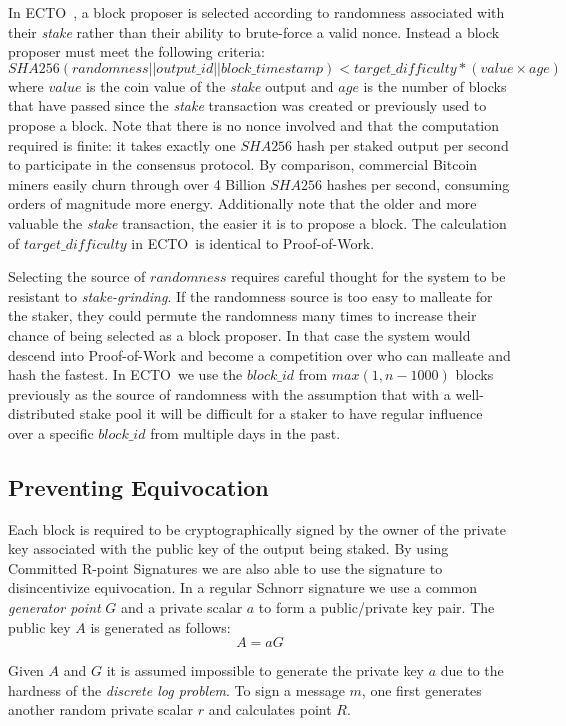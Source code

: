 \documentclass{article}
\newcommand{\coin}{ \textsc{ECTO}\ }
\begin{document}
In \coin, a block proposer is selected according to randomness associated with their \textit{stake} rather than their ability to brute-force a valid nonce. Instead a block proposer must meet the following criteria:  
$$SHA256(randomness || output\_id || block\_timestamp) < target\_difficulty * (value \times age) $$ 
where $value$ is the coin value of the \textit{stake} output and $age$ is the number of blocks that have passed since the \textit{stake} transaction was created or previously used to propose a block. Note that there is no nonce involved and that the computation required is finite: it takes exactly one $SHA256$ hash per staked output per second to participate in the consensus protocol. By comparison, commercial Bitcoin miners easily churn through over 4 Billion $SHA256$ hashes per second, consuming orders of magnitude more energy. Additionally note that the older and more valuable the \textit{stake} transaction, the easier it is to propose a block. The calculation of $target\_difficulty$ in \coin is identical to Proof-of-Work. 

Selecting the source of $randomness$ requires careful thought for the system to be resistant to \textit{stake-grinding}. If the randomness source is too easy to malleate for the staker, they could permute the randomness many times to increase their chance of being selected as a block proposer. In that case the system would descend into Proof-of-Work and become a competition over who can malleate and hash the fastest. In \coin we use the $ block\_id $ from $ max(1, n - 1000) $ blocks previously as the source of randomness with the assumption that with a well-distributed stake pool it will be difficult for a staker to have regular influence over a specific $block\_id$ from multiple days in the past. 

\subsection{Preventing Equivocation}
Each block is required to be cryptographically signed by the owner of the private key associated with the public key of the output being staked. By using Committed R-point Signatures \cite{dlc} we are also able to use the signature to disincentivize equivocation. In a regular Schnorr signature we use a common \textit{generator point} $ G $ and a private scalar $ a $ to form a public/private key pair. The public key $ A $ is generated as follows:
$$ A = aG $$

Given $ A $ and $ G $ it is assumed impossible to generate the private key $ a $ due to the hardness of the \textit{discrete log problem}. To sign a message $ m $, one first generates another random private scalar $ r $ and calculates point $ R $.
\end{document}
